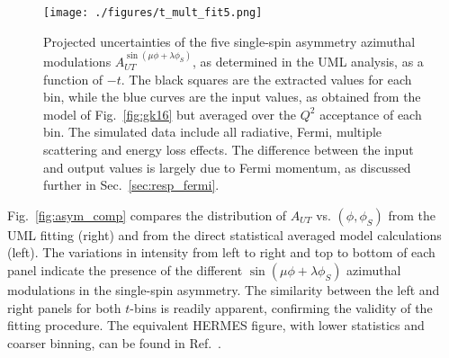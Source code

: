\begin{figure}[hbt!]
\begin{center}
\texttt{[image: ./figures/t\_mult\_fit5.png]}
\end{center}
\caption{\label{fig:asym1_t}
\footnotesize{Projected uncertainties of the five single-spin asymmetry
  azimuthal modulations $A_{UT}^{\sin(\mu\phi+\lambda\phi_S)}$, as determined
  in the UML analysis, as a function of $-t$.  The black squares are the
  extracted values for each bin, while the blue curves are the input values, as
  obtained from the model of Fig.~\ref{fig:gk16} but averaged over the $Q^2$
  acceptance of each bin.  The simulated data include all radiative, Fermi,
  multiple scattering and energy loss effects.  The difference between the
  input and output values is largely due to Fermi momentum, as discussed
  further in Sec.~\ref{sec:resp_fermi}.}}
\end{figure}

Fig.~\ref{fig:asym_comp} compares the distribution of $A_{UT}$
vs. $(\phi,\phi_S)$ from the UML fitting (right) and from the direct
statistical averaged model calculations (left).
The variations in intensity from left to right and top to bottom of each panel
indicate the presence of the different $\sin(\mu\phi+\lambda\phi_S)$ azimuthal
modulations in the single-spin asymmetry.  The
similarity between the left and right panels for both $t$-bins is readily
apparent, confirming the validity of the fitting procedure.  The equivalent
HERMES figure, with lower statistics and coarser binning, can be found in
Ref.~\cite{hermes-thesis}.

